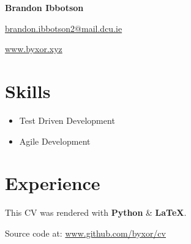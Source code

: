 \documentclass{article}
\makeatletter
\newcommand{\youremail}[1]{ \href{#1}{#1} }
\renewcommand{\maketitle}{
  \vspace{.25em}
  \begin{center}
   { \huge \bfseries Brandon Ibbotson }

   \youremail{ brandon.ibbotson2@mail.dcu.ie }

   \url{ www.byxor.xyz }
  \end{center}
  \vspace{1em}
}
\makeatother
\begin{document}
\maketitle
\section{Skills}
\begin{itemize}
 \item Test Driven Development
 \item Agile Development
\end{itemize}
\section{Experience}
\vspace*{\fill}
\begin{center}
This CV was rendered with \textbf{Python} {\&} \textbf{{\LaTeX}}.

Source code at: \url{www.github.com/byxor/cv}
\end{center}
\end{document}
